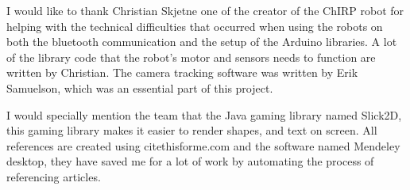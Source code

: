 I would like to thank Christian Skjetne one of the creator of the ChIRP robot for helping with the technical difficulties that occurred when using the robots on both the bluetooth communication and the setup of the Arduino libraries. A lot of the library code that the robot's motor and sensors needs to function are written by Christian. The camera tracking software was written by Erik Samuelson, which was an essential part of this project.

I would specially mention the team that the Java gaming library named Slick2D, this gaming library makes it easier to render shapes, and text on screen.
All references are created using citethisforme.com and the software named Mendeley desktop, they have saved me for a lot of work by automating the process of referencing articles.
